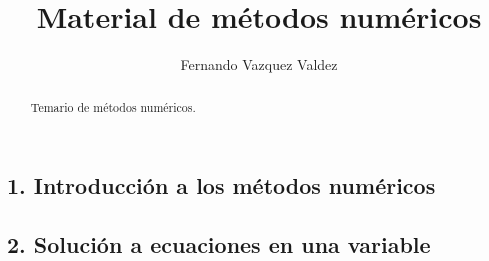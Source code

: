 \documentclass{article}
\begin{document}
\label{principal}

\title{Material de métodos numéricos}
\author{Fernando Vazquez Valdez}



\maketitle


\begin{abstract} %
\centering
Temario de métodos numéricos.
\end{abstract}
\newpage

\begin{center}
\section*{1. Introducción a los métodos numéricos}
\end{center}



\newpage

\begin{center}
\section*{2. Solución a ecuaciones en una variable}
\end{center}


\newpage


\newpage


\newpage


\newpage


\newpage


\newpage


\newpage


\end{document}
